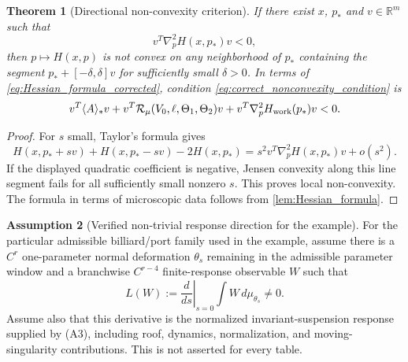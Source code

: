 \documentclass[12pt, letterpaper]{amsart}
\newcommand{\R}{\mathbb{R}}
\theoremstyle{plain}
\newtheorem{theorem}{Theorem}[section]
\theoremstyle{definition}
\newtheorem{assumption}[theorem]{Assumption}
\theoremstyle{remark}
\begin{document}
\begin{theorem}[Directional non-convexity criterion]
\label{thm:non_convexity_proven}
If there exist $x$, $p_*$ and $v\in\R^m$ such that
\begin{equation}
\label{eq:correct_nonconvexity_condition}
    v^T\nabla_p^2H(x,p_*)v<0,
\end{equation}
then $p\mapsto H(x,p)$ is not convex on any neighborhood of $p_*$ containing the segment $p_*+[-\delta,\delta]v$ for sufficiently small $\delta>0$.  In terms of \eqref{eq:Hessian_formula_corrected}, condition \eqref{eq:correct_nonconvexity_condition} is
\begin{equation}
    v^T\langle A\rangle_*v
    +v^T\mathcal R_{\mu}(V_0,\ell,\Theta_1,\Theta_2)v
    +v^T\nabla_p^2H_{\rm work}(p_*)v<0 .
\end{equation}
\end{theorem}

\begin{proof}
For $s$ small, Taylor's formula gives
\begin{equation}
    H(x,p_*+sv)+H(x,p_*-sv)-2H(x,p_*)
    =s^2 v^T\nabla_p^2H(x,p_*)v+o(s^2).
\end{equation}
If the displayed quadratic coefficient is negative, Jensen convexity along this line segment fails for all sufficiently small nonzero $s$.  This proves local non-convexity.  The formula in terms of microscopic data follows from \cref{lem:Hessian_formula}.
\end{proof}



\begin{assumption}[Verified non-trivial response direction for the example]
\label{lem:nontrivial_geometric_response_direction}
For the particular admissible billiard/port family used in the example, assume
there is a $C^r$ one-parameter normal deformation $\theta_s$ remaining in the
admissible parameter window and a branchwise $C^{r-4}$ finite-response
observable $W$ such that
\begin{equation}
\label{eq:first_response_nonzero_W}
    L(W):=\left.\frac{d}{ds}\right|_{s=0}\int W\,d\mu_{\theta_s}\ne0.
\end{equation}
Assume also that this derivative is the normalized invariant-suspension
response supplied by \textup{(A3)}, including roof, dynamics, normalization,
and moving-singularity contributions. This is not asserted for every table.
\end{assumption}
\end{document}
